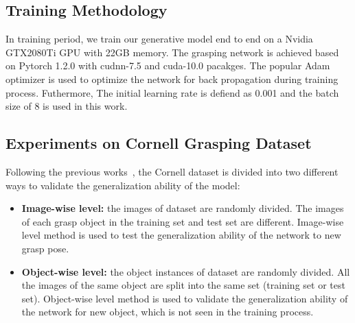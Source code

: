 \documentclass[journal]{IEEEtran}
\begin{document}
\subsection{Training Methodology}

In training period, we train our generative model end to end on a Nvidia GTX2080Ti GPU with 22GB memory. The grasping network is achieved based on Pytorch 1.2.0 with cudnn-7.5 and cuda-10.0 pacakges.  The popular Adam optimizer is used to optimize the network for back propagation during training process. Futhermore, The initial learning rate is defiend as 0.001 and the batch size of 8 is used in this work.

\subsection{Experiments on Cornell Grasping Dataset}
Following the previous works~\cite{chu,zhou,song}, the Cornell dataset is divided into two different ways to validate the generalization ability of the model:


\begin{itemize}
	
	\item \textbf{Image-wise level:} the images of dataset are randomly divided. The images of each grasp object in the training set and test set are different. Image-wise level method is used to test the generalization ability of the network to new grasp pose.
	
	\item \textbf{Object-wise level:}  the object instances of dataset are randomly divided. All the images of the same object are split into the same set (training set or test set). Object-wise level method is used to validate the generalization ability of the network for new object, which is not seen in the training process.
	
\end{itemize}
\end{document}
